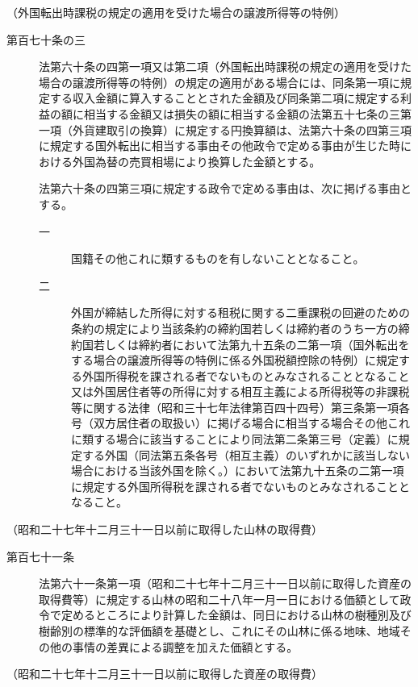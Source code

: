 \documentclass[twocolumn,a4j,10pt]{ltjtarticle}
\begin{document}
\noindent\hspace{10pt}（外国転出時課税の規定の適用を受けた場合の譲渡所得等の特例）
\begin{description}
\item[第百七十条の三]法第六十条の四第一項又は第二項（外国転出時課税の規定の適用を受けた場合の譲渡所得等の特例）の規定の適用がある場合には、同条第一項に規定する収入金額に算入することとされた金額及び同条第二項に規定する利益の額に相当する金額又は損失の額に相当する金額の法第五十七条の三第一項（外貨建取引の換算）に規定する円換算額は、法第六十条の四第三項に規定する国外転出に相当する事由その他政令で定める事由が生じた時における外国為替の売買相場により換算した金額とする。
\item[]法第六十条の四第三項に規定する政令で定める事由は、次に掲げる事由とする。
\begin{description}
\item[一]国籍その他これに類するものを有しないこととなること。
\item[二]外国が締結した所得に対する租税に関する二重課税の回避のための条約の規定により当該条約の締約国若しくは締約者のうち一方の締約国若しくは締約者において法第九十五条の二第一項（国外転出をする場合の譲渡所得等の特例に係る外国税額控除の特例）に規定する外国所得税を課される者でないものとみなされることとなること又は外国居住者等の所得に対する相互主義による所得税等の非課税等に関する法律（昭和三十七年法律第百四十四号）第三条第一項各号（双方居住者の取扱い）に掲げる場合に相当する場合その他これに類する場合に該当することにより同法第二条第三号（定義）に規定する外国（同法第五条各号（相互主義）のいずれかに該当しない場合における当該外国を除く。）において法第九十五条の二第一項に規定する外国所得税を課される者でないものとみなされることとなること。
\end{description}
\end{description}
\noindent\hspace{10pt}（昭和二十七年十二月三十一日以前に取得した山林の取得費）
\begin{description}
\item[第百七十一条]法第六十一条第一項（昭和二十七年十二月三十一日以前に取得した資産の取得費等）に規定する山林の昭和二十八年一月一日における価額として政令で定めるところにより計算した金額は、同日における山林の樹種別及び樹齢別の標準的な評価額を基礎とし、これにその山林に係る地味、地域その他の事情の差異による調整を加えた価額とする。
\end{description}
\noindent\hspace{10pt}（昭和二十七年十二月三十一日以前に取得した資産の取得費）
\end{document}
